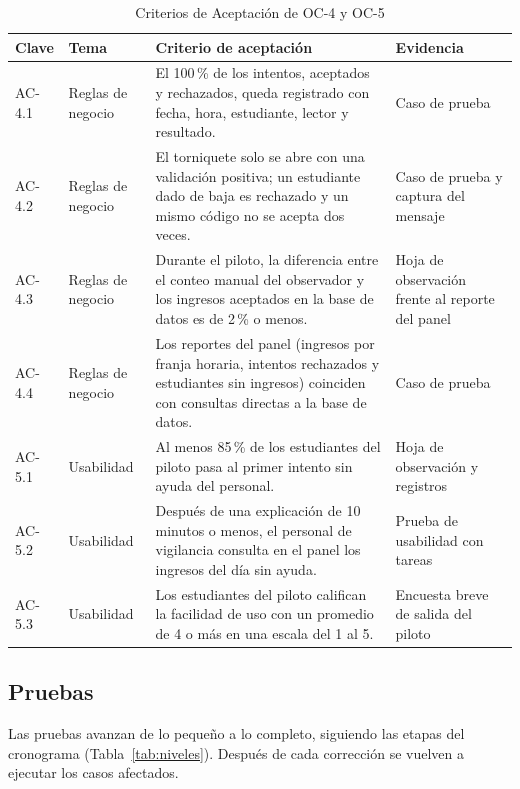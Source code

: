 \begin{table}[tbp]
	\caption{Criterios de Aceptación de OC-4 y OC-5}
	\label{tab:ac2}
	\small\setlength{\tabcolsep}{3pt}
	\begin{tabular}{P{1.2cm}P{2cm}P{7.6cm}P{4cm}}
		\toprule
		Clave & Tema & Criterio de aceptación & Evidencia \\
		\midrule
		AC-4.1 & Reglas de negocio & El 100\,\% de los intentos, aceptados y rechazados, queda registrado con fecha, hora, estudiante, lector y resultado. & Caso de prueba \\
		AC-4.2 & Reglas de negocio & El torniquete solo se abre con una validación positiva; un estudiante dado de baja es rechazado y un mismo código no se acepta dos veces. & Caso de prueba y captura del mensaje \\
		AC-4.3 & Reglas de negocio & Durante el piloto, la diferencia entre el conteo manual del observador y los ingresos aceptados en la base de datos es de 2\,\% o menos. & Hoja de observación frente al reporte del panel \\
		AC-4.4 & Reglas de negocio & Los reportes del panel (ingresos por franja horaria, intentos rechazados y estudiantes sin ingresos) coinciden con consultas directas a la base de datos. & Caso de prueba \\
		AC-5.1 & Usabilidad & Al menos 85\,\% de los estudiantes del piloto pasa al primer intento sin ayuda del personal. & Hoja de observación y registros \\
		AC-5.2 & Usabilidad & Después de una explicación de 10 minutos o menos, el personal de vigilancia consulta en el panel los ingresos del día sin ayuda. & Prueba de usabilidad con tareas \\
		AC-5.3 & Usabilidad & Los estudiantes del piloto califican la facilidad de uso con un promedio de 4 o más en una escala del 1 al 5. & Encuesta breve de salida del piloto \\
		\bottomrule
	\end{tabular}
\end{table}

\subsection{Pruebas}
Las pruebas avanzan de lo pequeño a lo completo, siguiendo las etapas del
cronograma (Tabla~\ref{tab:niveles}). Después de cada corrección se vuelven a
ejecutar los casos afectados.


